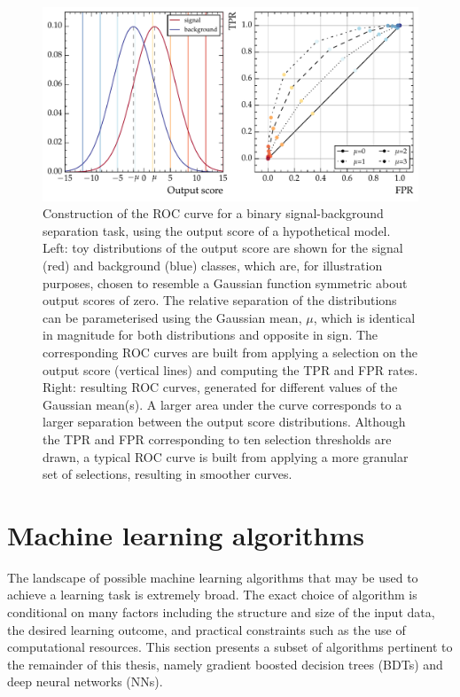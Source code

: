 \begin{figure}[htbp!]
\centering
\includegraphics[width =0.95\linewidth]{Figures/ML/ROC_example.pdf}\hfill%
\caption[The construction of an ROC curve from the output score of a binary classifier.]{Construction of the ROC curve for a binary signal-background separation task, using the output score of a hypothetical model. Left: toy distributions of the output score are shown for the signal (red) and background (blue) classes, which are, for illustration purposes, chosen to resemble a Gaussian function symmetric about output scores of zero. The relative separation of the distributions can be parameterised using the Gaussian mean, $\mu$, which is identical in magnitude for both distributions and opposite in sign. The corresponding ROC curves are built from applying a selection on the output score (vertical lines) and computing the TPR and FPR rates. Right: resulting ROC curves, generated for different values of the Gaussian mean(s). A larger area under the curve corresponds to a larger separation between the output score distributions. Although the TPR and FPR corresponding to ten selection thresholds are drawn, a typical ROC curve is built from applying a more granular set of selections, resulting in smoother curves.}
\label{fig:ML_ROC_example}
\end{figure}



\section{Machine learning algorithms}

The landscape of possible machine learning algorithms that may be used to achieve a learning task is extremely broad.
The exact choice of algorithm is conditional on many factors including the structure and size of the input data, the desired learning outcome, and practical constraints such as the use of computational resources.
This section presents a subset of algorithms pertinent to the remainder of this thesis, namely gradient boosted decision trees (BDTs) and deep neural networks (NNs). 

